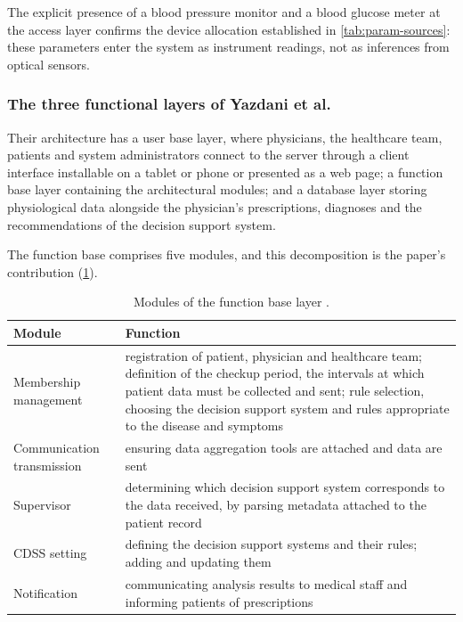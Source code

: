 \documentclass[12pt,a4paper,oneside]{report}
\begin{document}
The explicit presence of a blood pressure monitor and a blood glucose meter at the access layer confirms the device allocation established in \cref{tab:param-sources}: these parameters enter the system as instrument readings, not as inferences from optical sensors.

\subsubsection{The three functional layers of Yazdani et al.}

Their architecture has a user base layer, where physicians, the healthcare team, patients and system administrators connect to the server through a client interface installable on a tablet or phone or presented as a web page; a function base layer containing the architectural modules; and a database layer storing physiological data alongside the physician's prescriptions, diagnoses and the recommendations of the decision support system.

The function base comprises five modules, and this decomposition is the paper's contribution (\cref{tab:yazdani-modules}).

\begin{table}[htbp]
\centering\footnotesize
\caption{Modules of the function base layer \parencite{yazdani2018}.}\label{tab:yazdani-modules}
\begin{tabularx}{\textwidth}{@{}>{\raggedright\arraybackslash}p{3.3cm} X@{}}
\toprule
\textbf{Module} & \textbf{Function} \\
\midrule
Membership management & registration of patient, physician and healthcare team; definition of the checkup period, the intervals at which patient data must be collected and sent; rule selection, choosing the decision support system and rules appropriate to the disease and symptoms \\
Communication transmission & ensuring data aggregation tools are attached and data are sent \\
Supervisor & determining which decision support system corresponds to the data received, by parsing metadata attached to the patient record \\
CDSS setting & defining the decision support systems and their rules; adding and updating them \\
Notification & communicating analysis results to medical staff and informing patients of prescriptions \\
\bottomrule
\end{tabularx}
\end{table}
\end{document}
